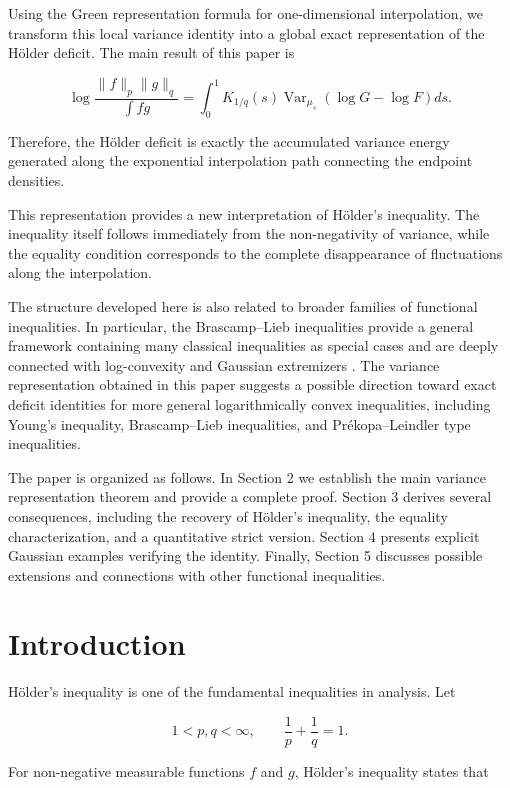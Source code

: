 \documentclass[11pt]{amsart}
\begin{document}
Using the Green representation formula for one-dimensional
interpolation, we transform this local variance identity into a
global exact representation of the Hölder deficit. The main result of
this paper is

\[
\boxed{
\log
\frac{
\|f\|_p\|g\|_q
}{
\int fg
}
=
\int_0^1
K_{1/q}(s)
\operatorname{Var}_{\mu_s}
(
\log G-\log F
)
ds .
}
\]

Therefore, the Hölder deficit is exactly the accumulated variance
energy generated along the exponential interpolation path connecting
the endpoint densities.


This representation provides a new interpretation of Hölder's
inequality. The inequality itself follows immediately from the
non-negativity of variance, while the equality condition corresponds
to the complete disappearance of fluctuations along the
interpolation.


The structure developed here is also related to broader families of
functional inequalities. In particular, the Brascamp--Lieb
inequalities provide a general framework containing many classical
inequalities as special cases and are deeply connected with
log-convexity and Gaussian extremizers
\cite{BrascampLieb1976}. The variance representation obtained in
this paper suggests a possible direction toward exact deficit
identities for more general logarithmically convex inequalities,
including Young's inequality, Brascamp--Lieb inequalities, and
Prékopa--Leindler type inequalities.


The paper is organized as follows. In Section 2 we establish the
main variance representation theorem and provide a complete proof.
Section 3 derives several consequences, including the recovery of
Hölder's inequality, the equality characterization, and a
quantitative strict version. Section 4 presents explicit Gaussian
examples verifying the identity. Finally, Section 5 discusses
possible extensions and connections with other functional
inequalities.



\section{Introduction}


Hölder's inequality is one of the fundamental inequalities in
analysis. Let

\[
1<p,q<\infty,
\qquad
\frac1p+\frac1q=1 .
\]

For non-negative measurable functions $f$ and $g$, Hölder's
inequality states that
\end{document}
